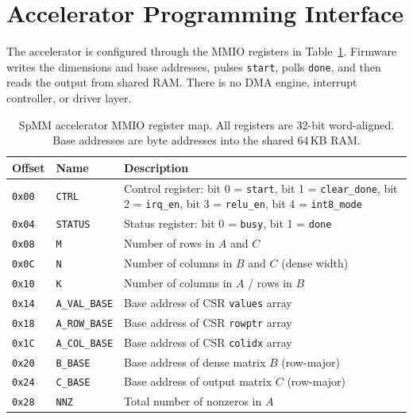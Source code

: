 \vspace{6cm}

\section{Accelerator Programming Interface}

The accelerator is configured through the MMIO registers in
Table~\ref{tab:mmio-regs}. Firmware writes the dimensions and base
addresses, pulses \texttt{start}, polls \texttt{done}, and then reads the
output from shared RAM. There is no DMA engine, interrupt controller, or
driver layer.

\begin{table}[htbp]
  \centering
  \small
  \begin{tabular}{llp{10cm}}
  \toprule
  Offset & Name & Description \\
  \midrule
  \texttt{0x00} & \texttt{CTRL} &
    Control register: bit 0 = \texttt{start},
    bit 1 = \texttt{clear\_done}, bit 2 = \texttt{irq\_en}, bit 3 = \texttt{relu\_en},
    bit 4 = \texttt{int8\_mode} \\[4pt]
  \texttt{0x04} & \texttt{STATUS} &
    Status register: bit 0 = \texttt{busy}, bit 1 = \texttt{done} \\[4pt]
  \texttt{0x08} & \texttt{M} & Number of rows in $A$ and $C$ \\
  \texttt{0x0C} & \texttt{N} & Number of columns in $B$ and $C$ (dense width) \\
  \texttt{0x10} & \texttt{K} & Number of columns in $A$ / rows in $B$ \\
  \texttt{0x14} & \texttt{A\_VAL\_BASE} & Base address of CSR \texttt{values} array \\
  \texttt{0x18} & \texttt{A\_ROW\_BASE} & Base address of CSR \texttt{rowptr} array \\
  \texttt{0x1C} & \texttt{A\_COL\_BASE} & Base address of CSR \texttt{colidx} array \\
  \texttt{0x20} & \texttt{B\_BASE} & Base address of dense matrix $B$ (row-major) \\
  \texttt{0x24} & \texttt{C\_BASE} & Base address of output matrix $C$ (row-major) \\
  \texttt{0x28} & \texttt{NNZ} & Total number of nonzeros in $A$ \\
  \bottomrule
  \end{tabular}
  \caption{SpMM accelerator MMIO register map. All registers are 32-bit
           word-aligned. Base addresses are byte addresses into the shared
           64\,KB RAM.}
  \label{tab:mmio-regs}
\end{table}


